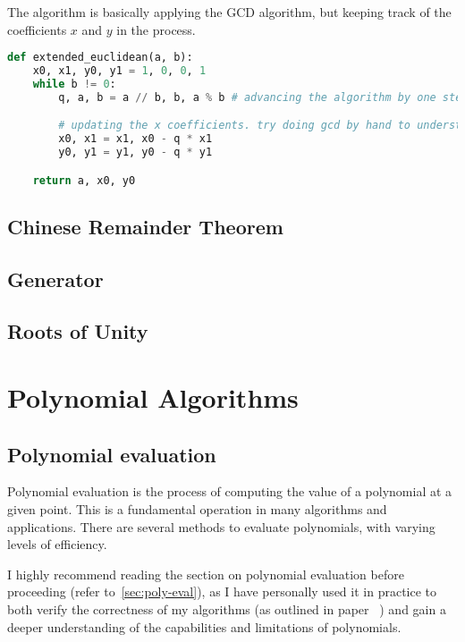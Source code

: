 The algorithm is basically applying the GCD algorithm, but keeping track of the coefficients
$x$ and $y$ in the process.

\begin{lstlisting}[language=Python,
  caption={Extended Euclidean Algorithm in python}
]
def extended_euclidean(a, b):
    x0, x1, y0, y1 = 1, 0, 0, 1
    while b != 0:
        q, a, b = a // b, b, a % b # advancing the algorithm by one step.

        # updating the x coefficients. try doing gcd by hand to understand this.
        x0, x1 = x1, x0 - q * x1 
        y0, y1 = y1, y0 - q * y1

    return a, x0, y0

\end{lstlisting}



\section{Chinese Remainder Theorem}

\section{Generator}

\section{Roots of Unity}



\chapter{Polynomial Algorithms}\label{chapter:polynomial-algorithms}

\section{Polynomial evaluation}
Polynomial evaluation is the process of computing the value of a polynomial at a given point.
This is a fundamental operation in many algorithms and applications. 
There are several methods to evaluate polynomials, with varying levels of efficiency.

I highly recommend reading the section on polynomial evaluation before 
proceeding (refer to~\ref{sec:poly-eval}), as I have personally used it in 
practice to both verify the correctness of my algorithms (as outlined
 in paper~\cite{SPIR} ) and gain a deeper 
 understanding of the capabilities and limitations of polynomials.

